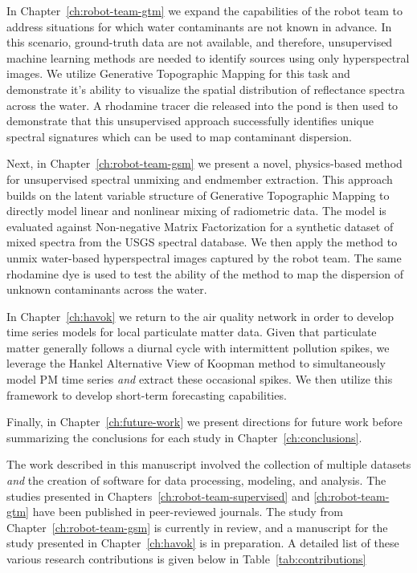 In Chapter~\ref{ch:robot-team-gtm} we expand the capabilities of the robot team
to address situations for which water contaminants are not known in advance. In
this scenario, ground-truth data are not available, and therefore, unsupervised
machine learning methods are needed to identify sources using only hyperspectral
images. We utilize Generative Topographic Mapping for this task and demonstrate
it's ability to visualize the spatial distribution of reflectance spectra across
the water. A rhodamine tracer die released into the pond is then used to
demonstrate that this unsupervised approach successfully identifies unique
spectral signatures which can be used to map contaminant dispersion.

Next, in Chapter~\ref{ch:robot-team-gsm} we present a novel, physics-based
method for unsupervised spectral unmixing and endmember extraction.
This approach builds on the latent variable structure of Generative Topographic
Mapping to directly model linear and nonlinear mixing of radiometric data.
The model is evaluated against Non-negative Matrix Factorization for a
synthetic dataset of mixed spectra from the USGS spectral database. We then
apply the method to unmix water-based hyperspectral images captured by the robot
team. The same rhodamine dye is used to test the ability of the method to map
the dispersion of unknown contaminants across the water.

In Chapter~\ref{ch:havok} we return to the air quality network in order to develop time
series models for local particulate matter data. Given that particulate matter
generally follows a diurnal cycle with intermittent pollution spikes, we
leverage the Hankel Alternative View of Koopman method to simultaneously model
PM time series \textit{and} extract these occasional spikes. We then utilize
this framework to develop short-term forecasting capabilities.

Finally, in Chapter~\ref{ch:future-work} we present directions for future work
before summarizing the conclusions for each study in
Chapter~\ref{ch:conclusions}.


The work described in this manuscript involved the collection of multiple
datasets \textit{and} the creation of software for data processing, modeling,
and analysis. The studies presented in Chapters~\ref{ch:robot-team-supervised}
and \ref{ch:robot-team-gtm} have been published in peer-reviewed journals. The
study from Chapter~\ref{ch:robot-team-gsm} is currently in review, and a
manuscript for the study presented in Chapter~\ref{ch:havok} is in preparation.
A detailed list of these various research contributions is given below in
Table~\ref{tab:contributions}


